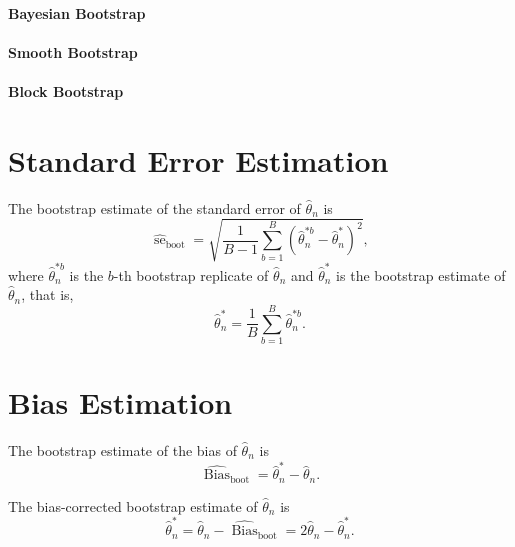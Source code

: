 \paragraph{Bayesian Bootstrap}

\paragraph{Smooth Bootstrap}

\paragraph{Block Bootstrap}

\section{Standard Error Estimation}

The bootstrap estimate of the standard error of \(\hat{\theta}_{n}\) is
\begin{equation}
	\widehat{\operatorname{se}}_{\text{boot}}=\sqrt{\frac{1}{B-1}\sum_{b=1}^{B}{\left(\hat{\theta}_{n}^{*b}-\hat{\theta}_{n}^{*}\right)}^{2}},
\end{equation}
where \(\hat{\theta}_{n}^{*b}\) is the \(b\)-th bootstrap replicate of \(\hat{\theta}_{n}\) and \(\hat{\theta}_{n}^{*}\) is the bootstrap estimate of \(\hat{\theta}_{n}\), that is,
\begin{equation}
	\hat{\theta}_{n}^{*}=\frac{1}{B}\sum_{b=1}^{B}\hat{\theta}_{n}^{*b}.
\end{equation}

\section{Bias Estimation}

The bootstrap estimate of the bias of \(\hat{\theta}_{n}\) is
\begin{equation}
	\widehat{\operatorname{Bias}}_{\text{boot}}=\hat{\theta}_{n}^{*}-\hat{\theta}_{n}.
\end{equation}

\begin{remark}
	The bias-corrected bootstrap estimate of \(\hat{\theta}_{n}\) is
	\begin{equation}
		\hat{\theta}_{n}^{*}=\hat{\theta}_{n}-\widehat{\operatorname{Bias}}_{\text{boot}}=2\hat{\theta}_{n}-\hat{\theta}_{n}^{*}.
	\end{equation}
\end{remark}

